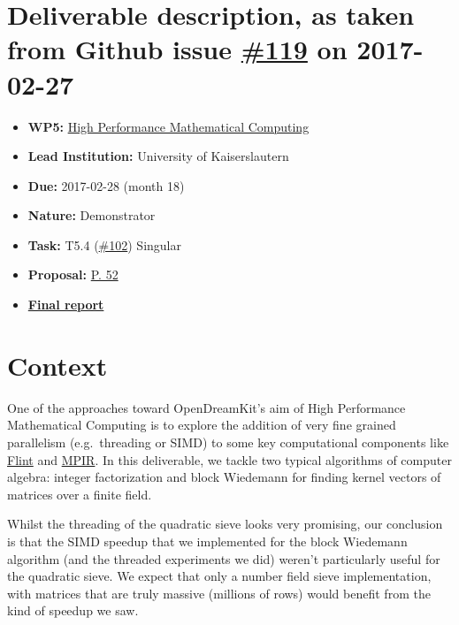 \section*{\texorpdfstring{Deliverable description, as taken from Github
issue
\href{https://github.com/OpenDreamKit/OpenDreamKit/issues/119}{\#119} on
2017-02-27}{Deliverable description, as taken from Github issue \#119 on 2017-02-27}}\label{deliverable-description-as-taken-from-github-issue-119-on-2017-02-27}

\begin{itemize}
\tightlist
\item
  \textbf{WP5:}
  \href{https://github.com/OpenDreamKit/OpenDreamKit/tree/master/WP5}{High
  Performance Mathematical Computing}
\item
  \textbf{Lead Institution:} University of Kaiserslautern
\item
  \textbf{Due:} 2017-02-28 (month 18)
\item
  \textbf{Nature:} Demonstrator
\item
  \textbf{Task:} T5.4
  (\href{https://github.com/OpenDreamKit/OpenDreamKit/issues/102}{\#102})
  Singular
\item
  \textbf{Proposal:}
  \href{https://github.com/OpenDreamKit/OpenDreamKit/raw/master/Proposal/proposal-www.pdf}{P.
  52}
\item
  \textbf{\href{https://github.com/OpenDreamKit/OpenDreamKit/raw/master/WP5/D5.6/report-final.pdf}{Final
  report}}
\end{itemize}

\section*{Context}\label{context}

One of the approaches toward OpenDreamKit's aim of High Performance
Mathematical Computing is to explore the addition of very fine grained
parallelism (e.g.~threading or SIMD) to some key computational
components like \href{http://flintlib.org}{Flint} and
\href{http://mpir.org/}{MPIR}. In this deliverable, we tackle two
typical algorithms of computer algebra: integer factorization and block
Wiedemann for finding kernel vectors of matrices over a finite field.

Whilst the threading of the quadratic sieve looks very promising, our
conclusion is that the SIMD speedup that we implemented for the block
Wiedemann algorithm (and the threaded experiments we did) weren't
particularly useful for the quadratic sieve. We expect that only a
number field sieve implementation, with matrices that are truly massive
(millions of rows) would benefit from the kind of speedup we saw.

